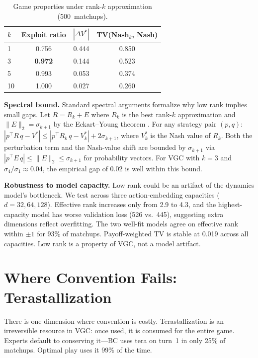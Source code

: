\documentclass{article}
\begin{document}
\begin{table}[t]
\caption{Game properties under rank-$k$ approximation (500~matchups).}
\label{tab:rank_reduction}
\vskip 0.1in
\centering
\small
\begin{tabular}{lccc}
\toprule
$k$ & Exploit ratio & $|\Delta V^*|$ & TV(Nash$_k$, Nash) \\
\midrule
1 & 0.756 & 0.444 & 0.850 \\
3 & \textbf{0.972} & 0.144 & 0.523 \\
5 & 0.993 & 0.053 & 0.374 \\
10 & 1.000 & 0.027 & 0.260 \\
\bottomrule
\end{tabular}
\vskip -0.1in
\end{table}

\textbf{Spectral bound.} Standard spectral arguments formalize why low rank implies small gaps. Let $R = R_k + E$ where $R_k$ is the best rank-$k$ approximation and $\|E\|_2 = \sigma_{k+1}$ by the Eckart--Young theorem \citep{eckart1936approximation}. For any strategy pair $(p, q)$: $|p^\top R\, q - V^*| \leq |p^\top R_k\, q - V^*_k| + 2\sigma_{k+1}$, where $V^*_k$ is the Nash value of $R_k$. Both the perturbation term and the Nash-value shift are bounded by $\sigma_{k+1}$ via $|p^\top E\, q| \leq \|E\|_2 \leq \sigma_{k+1}$ for probability vectors. For VGC with $k = 3$ and $\sigma_4 / \sigma_1 \approx 0.04$, the empirical gap of 0.02 is well within this bound.

\textbf{Robustness to model capacity.} Low rank could be an artifact of the dynamics model's bottleneck. We test across three action-embedding capacities ($d = 32, 64, 128$). Effective rank increases only from 2.9 to 4.3, and the highest-capacity model has worse validation loss (526 vs.\ 445), suggesting extra dimensions reflect overfitting. The two well-fit models agree on effective rank within $\pm 1$ for 93\% of matchups. Payoff-weighted TV is stable at 0.019 across all capacities. Low rank is a property of VGC, not a model artifact.

\section{Where Convention Fails: Terastallization}
\label{sec:tera}

There is one dimension where convention is costly. Terastallization is an irreversible resource in VGC: once used, it is consumed for the entire game. Experts default to conserving it---BC uses tera on turn~1 in only 25\% of matchups. Optimal play uses it 99\% of the time.
\end{document}

